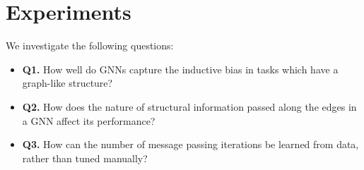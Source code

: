 \section{Experiments}
\label{sec:experiments}
We investigate the following questions:
\begin{itemize}[noitemsep,topsep=0pt]
\item \textbf{Q1.} How well do GNNs capture the inductive bias in tasks which have a graph-like structure?
\item \textbf{Q2.} How does the nature of structural information passed along the edges in a GNN affect its performance?
\item \textbf{Q3.} How can the number of message passing iterations be learned from data, rather than tuned manually?
\end{itemize}

